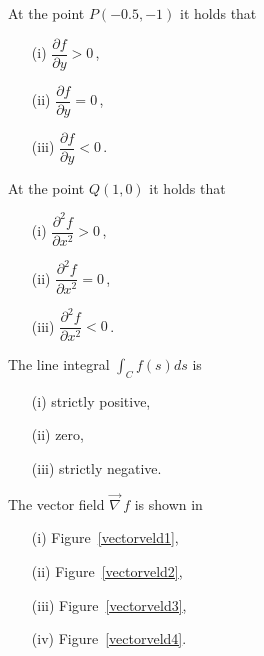 \begin{Exercise}
\Question At the point $P(-0.5,-1)$ it holds that
    \begin{multicols}{3}
    \begin{enumerate}
    \item[(i)] $\dfrac{\partial f}{\partial y}>0$\,,
    \item[(ii)] $\dfrac{\partial f}{\partial y}=0$\,,
    \item[(iii)] $\dfrac{\partial f}{\partial y}<0$\,.
    \end{enumerate}
    \end{multicols}
\Question At the point $Q(1,0)$ it holds that
    \begin{multicols}{3}
    \begin{enumerate}
    \item[(i)] $\dfrac{\partial^2 f}{\partial x^2}>0$\,,
    \item[(ii)] $\dfrac{\partial^2 f}{\partial x^2}=0$\,,
    \item[(iii)] $\dfrac{\partial^2 f}{\partial x^2}<0$\,.
    \end{enumerate}
    \end{multicols}
\Question The line integral $\displaystyle\int_Cf(s)ds$ is
    \begin{multicols}{3}
    \begin{enumerate}
    \item[(i)] strictly positive,
    \item[(ii)] zero,
    \item[(iii)] strictly negative.
    \end{enumerate}
    \end{multicols}
\Question The vector field $\vec{\nabla}\,f$ is shown in
    \begin{multicols}{4}
    \begin{enumerate}
    \item[(i)] Figure~\ref{vectorveld1},
    \item[(ii)] Figure~\ref{vectorveld2},
    \item[(iii)] Figure~\ref{vectorveld3},
    \item[(iv)] Figure~\ref{vectorveld4}.
    \end{enumerate}
    \end{multicols}


\begin{figure}[H]
\centering


\end{figure}
\end{Exercise}
